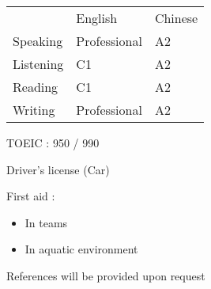 \documentclass[11pt]{spidercv}
\begin{document}
\begin{SideBar}{\ColorBackground}{\ColorTextSide}
  \vspace{0.5cm}


  \begin{tabular}{lll}
              & English      & Chinese \\
    \cmidrule{2-3}
    Speaking  & Professional & A2      \\
    \cmidrule{2-3}
    Listening & C1           & A2      \\
    \cmidrule{2-3}
    Reading   & C1           & A2      \\
    \cmidrule{2-3}
    Writing   & Professional & A2
  \end{tabular}

  \vspace{0.5cm}
  \begin{ItemList}{\ColorHighlight}
    \item [\ding{226}] TOEIC : 950 / 990
    \item [\ding{226}] Driver's license (Car)
    \item [\ding{226}] First aid :
    \begin{itemize}
      \item In teams
      \item In aquatic environment
    \end{itemize}
  \end{ItemList}

  \vspace{0.75cm}
  References will be provided upon request
\end{SideBar}



\end{document}
